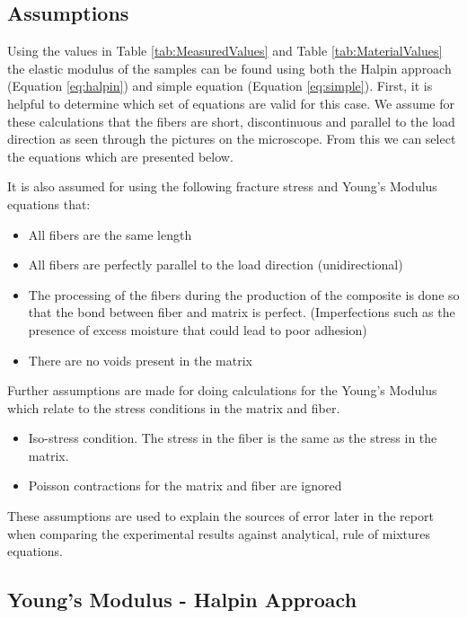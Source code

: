 \documentclass[11pt]{article}
\begin{document}
\subsection{Assumptions}
Using the values in Table \ref{tab:MeasuredValues} and Table \ref{tab:MaterialValues} the elastic modulus of the samples can be found using both the Halpin approach (Equation \ref{eq:halpin}) and simple equation (Equation \ref{eq:simple}). First, it is helpful to determine which set of equations are valid for this case. We assume for these calculations that the fibers are short, discontinuous and parallel to the load direction as seen through the pictures on the microscope. From this we can select the equations which are presented below. 

It is also assumed for using the following fracture stress and Young's Modulus equations that:

\begin{itemize}
\item All fibers are the same length
\item All fibers are perfectly parallel to the load direction (unidirectional)
\item The processing of the fibers during the production of the composite is done so that the bond between fiber and matrix is perfect. (Imperfections such as the presence of excess moisture that could lead to poor adhesion)
\item There are no voids present in the matrix
\end{itemize}

Further assumptions are made for doing calculations for the Young's Modulus which relate to the stress conditions in the matrix and fiber.

\begin{itemize}
\item Iso-stress condition. The stress in the fiber is the same as the stress in the matrix.
\item Poisson contractions for the matrix and fiber are ignored
\end{itemize}

These assumptions are used to explain the sources of error later in the report when comparing the experimental results against analytical, rule of mixtures equations.


\subsection{Young's Modulus - Halpin Approach}
\end{document}
